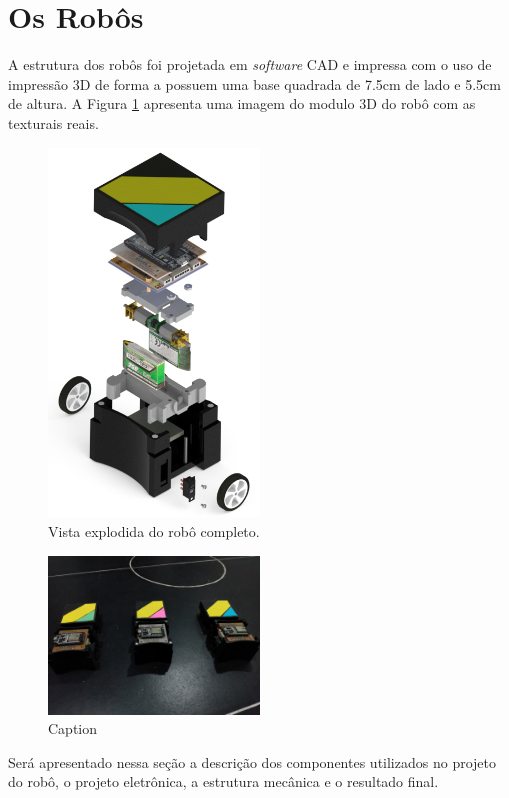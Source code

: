 \section{Os Robôs}
A estrutura dos robôs foi projetada em \emph{software} CAD e impressa com o uso de impressão 3D de forma a possuem uma base quadrada de 7.5cm de lado e 5.5cm de altura. A Figura \ref{fig:robo_completo_explodido} apresenta uma imagem do modulo 3D do robô com as texturais reais.\\

\begin{figure}[H]
    \centering
    \includegraphics[width=0.5\textwidth]{figuras/robo/robo_completo_explodido.png}
    \caption{Vista explodida do robô completo.}
    \label{fig:robo_completo_explodido}
\end{figure}

\begin{figure}[H]
    \centering
    \includegraphics[width=0.5\textwidth]{textuais/robo/robos_capa_aberta.jpg}
    \caption{Caption}
    \label{fig:robos_capa_aberta}
\end{figure}

Será apresentado nessa seção a descrição dos componentes utilizados no projeto do robô, o projeto eletrônica, a estrutura mecânica e o resultado final.



% 